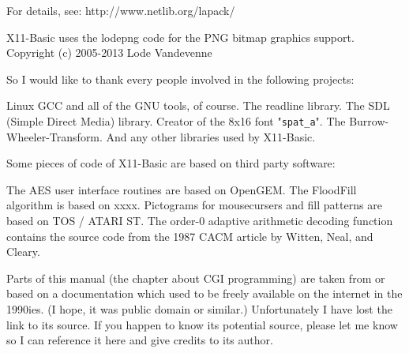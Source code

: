 For details, see: http://www.netlib.org/lapack/

X11-Basic uses the lodepng code for the PNG bitmap graphics support.
Copyright (c) 2005-2013 Lode Vandevenne




So I would like to thank every people involved in the following projects:

    Linux
    GCC and all of the GNU tools, of course.
    The readline library.
    The SDL (Simple Direct Media) library.
    Creator of the 8x16 font "\verb|spat_a|".
    The Burrow-Wheeler-Transform.
    And any other libraries used by X11-Basic.
 
Some pieces of code of X11-Basic are based on third party software:

    The AES user interface routines are based on OpenGEM.
    The FloodFill algorithm is based on xxxx.
    Pictograms for mousecursers and fill patterns are based on TOS / ATARI ST.
    The order-0 adaptive arithmetic decoding function  contains the source code 
    from the 1987 CACM article by Witten, Neal, and Cleary.
    

Parts of this manual (the chapter about CGI programming) are taken from or 
based on a documentation which used to be freely available on the internet  in
the 1990ies. (I hope, it was public domain or similar.) Unfortunately I have
lost the link to its source. If you happen to know its potential source, please
let me know so I can reference it here and give credits to its author.
